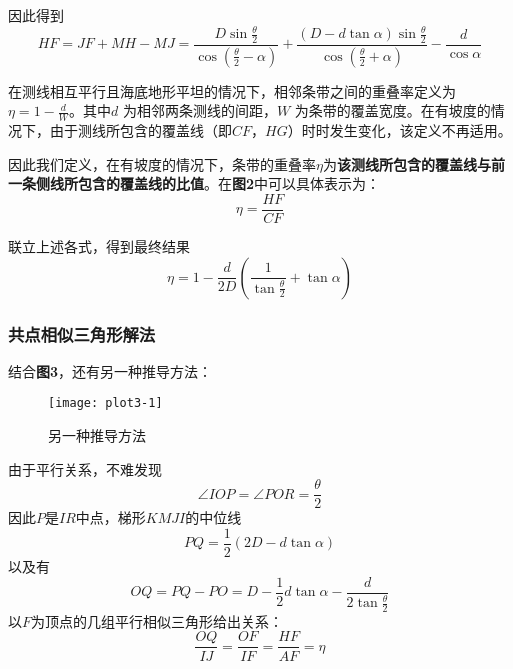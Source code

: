 \documentclass{cumcmthesis}
\begin{document}
因此得到
\begin{equation}
HF = JF+MH-MJ = \frac{D \sin \frac{\theta}{2}}{\cos(\frac{\theta}{2}-\alpha)} + \frac{(D-d\tan \alpha) \sin \frac{\theta}{2}}{\cos(\frac{\theta}{2}+\alpha)}-\frac{d}{\cos \alpha}
\label{eq:eq1-10}
\end{equation}

在测线相互平行且海底地形平坦的情况下，相邻条带之间的重叠率定义为 $\eta = 1−\frac{d}{W}$。其中$d$ 为相邻两条测线的间距，$W$ 为条带的覆盖宽度。在有坡度的情况下，由于测线所包含的覆盖线（即$CF$，$HG$）时时发生变化，该定义不再适用。

因此我们定义，在有坡度的情况下，条带的重叠率$\eta$为\textbf{该测线所包含的覆盖线与前一条侧线所包含的覆盖线的比值}。在\textbf{图2}中可以具体表示为：
\begin{equation}
\eta = \frac{HF}{CF}
\label{eq:eq1-11}
\end{equation}

联立上述各式，得到最终结果
\begin{equation}
\eta = 1 - \frac{d}{2D}(\frac{1}{\tan \frac{\theta}{2}}+\tan \alpha)
\label{eq:eq1-12}
\end{equation}

\subsubsection{共点相似三角形解法}

结合\textbf{图3}，还有另一种推导方法：
\begin{figure}[!h]
    \centering
    \texttt{[image: plot3-1]}
    \caption{另一种推导方法}
    \label{fig:plot1-1}
\end{figure}
由于平行关系，不难发现
\begin{equation}
\angle IOP = \angle POR = \frac{\theta}{2}
\label{eq:eq1-13}
\end{equation}
因此$P$是$IR$中点，梯形$KMJI$的中位线
\begin{equation}
PQ = \frac{1}{2}(2D-d\tan\alpha)
\label{eq:eq1-14}
\end{equation}
以及有
\begin{equation}
OQ = PQ - PO = D - \frac{1}{2}d\tan\alpha-\frac{d}{2\tan\frac{\theta}{2}} 
\label{eq:eq1-15}
\end{equation}
以$F$为顶点的几组平行相似三角形给出关系：
\begin{equation}
\frac{OQ}{IJ}= \frac{OF}{IF} = \frac{HF}{AF} = \eta
\label{eq:eq1-16}
\end{equation}
\end{document}
